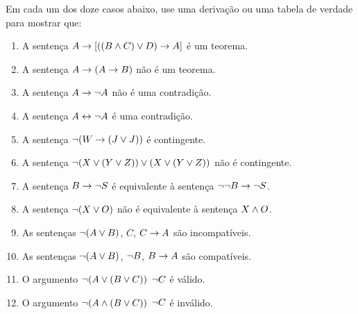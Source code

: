 \practiceproblems
\noindent\problempart Em cada um dos doze casos abaixo, use uma  derivação ou uma tabela de verdade para mostrar que: 
\begin{enumerate}%
\item  A sentença $A \rightarrow [((B \wedge C) \vee D) \rightarrow A]$  é um teorema.
\item  A sentença $A \rightarrow (A \rightarrow B)$  não é um teorema.
\item  A sentença $A \rightarrow \neg{A}$ não é uma contradição. 
\item  A sentença $A \leftrightarrow \neg A$ é uma contradição.  
\item  A sentença $ \neg (W \rightarrow (J \vee J)) $  é contingente.
\item  A sentença $ \neg(X \vee (Y \vee Z)) \vee (X \vee (Y \vee Z))$  não é contingente.
\item  A sentença $B \rightarrow \neg S$  é equivalente à sentença $\neg \neg B \rightarrow \neg S$.
\item  A sentença $ \neg (X \vee O) $ não é equivalente à sentença $X \wedge O$.
\item  As sentenças $\neg(A \vee B)$, $C$, $C \rightarrow A$  são incompatíveis.
\item  As sentenças $\neg(A \vee B)$, $\neg{B}$, $B \rightarrow A$ são compatíveis.
\item  O argumento $\neg(A \vee (B \vee C)) $ \therefore $ \neg{C}$ é válido.
\item  O argumento $\neg(A \wedge (B \vee C))$ \therefore $ \neg{C}$ é  inválido.
\end{enumerate}


